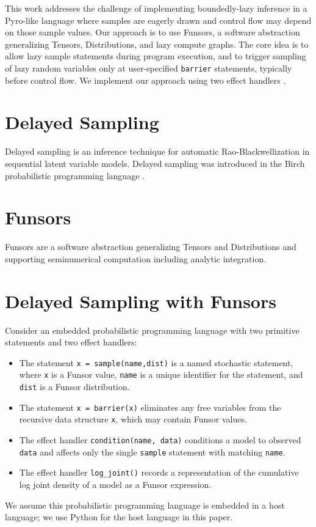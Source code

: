 \documentclass[anonymous=false, %
               format=acmsmall, %
               review=true, %
               screen=true, %
               nonacm=true]{acmart}
\begin{document}
This work addresses the challenge of implementing boundedly-lazy inference in a Pyro-like language where samples are eagerly drawn and control flow may depend on those sample values.
Our approach is to use Funsors, a software abstraction generalizing Tensors, Distributions, and lazy compute graphs.
The core idea is to allow lazy sample statements during program execution, and to trigger sampling of lazy random variables only at user-specified \verb$barrier$ statements, typically before control flow.
We implement our approach using two effect handlers \cite{moore2018effect,pretnar2015introduction}.

\section{Delayed Sampling}

Delayed sampling \cite{murray2017delayed} is an inference technique for automatic Rao-Blackwellization in sequential latent variable models.
Delayed sampling was introduced in the Birch probabilistic programming language \cite{murray2018automated}.

\section{Funsors}

Funsors \cite{obermeyer2019functional} are a software abstraction generalizing Tensors and Distributions and supporting seminumerical computation including analytic integration.

\section{Delayed Sampling with Funsors}

Consider an embedded probabilistic programming language with two primitive statements and two effect handlers:
\begin{itemize}
  \item The statement \verb$x = sample(name,dist)$ is a named stochastic statement, where \verb$x$ is a Funsor value, \verb$name$ is a unique identifier for the statement, and \verb$dist$ is a Funsor distribution.
  \item The statement \verb$x = barrier(x)$ eliminates any free variables from the recursive data structure \verb$x$, which may contain Funsor values.
  \item The effect handler \verb$condition(name, data)$ conditions a model to observed \verb$data$ and affects only the single \verb$sample$ statement with matching \verb$name$.
  \item The effect handler \verb$log_joint()$ records a representation of the cumulative log joint density of a model as a Funsor expression.
\end{itemize}
We assume this probabilistic programming language is embedded in a host language; we use Python for the host language in this paper.





\appendix
\end{document}
